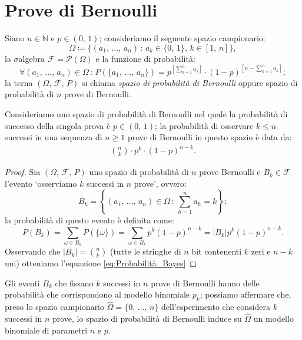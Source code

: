     \section{Prove di Bernoulli}
        \begin{defn}
            Siano $n \in \mathbb{N}$ e $p \in (0,\,1)$; consideriamo il seguente spazio campionario: \[
                \Omega \coloneqq \{(a_1,\,\ldots,\,a_n)\,:\,a_k \in \{0,\,1\},\, k \in [1,\,n]\}
                ,\] la $\sigma$\nbdash algebra $\mathscr{F} = \mathscr{P}(\Omega)$ e la funzione di probabilità: \[
                \forall (a_1,\, \ldots,\, a_n) \in \Omega \,:\, P(\{a_1,\, \ldots,\, a_n\}) = p^{\left[\sum_{k=1}^{n} a_k\right]} \cdot (1 - p)^{\left[n - \sum_{k=1}^{n} a_k\right]}
            ;\] 
            la terna $(\Omega,\,\mathscr{F},\,P)$ si chiama \emph{spazio di probabilità di Bernoulli} oppure spazio di probabilità di $n$ prove di Bernoulli.
        \end{defn}
        \begin{prty}
            Consideriamo uno spazio di probabilità di Bernoulli nel quale la probabilità di successo della singola prova è $p \in (0,\,1)$; la probabilità di osservare $k \leq n$ successi in una sequenza di $n \geq 1$ prove di Bernoulli in questo spazio è data da:
            \begin{align}\label{eq:Probabilità_Bayes}
                \binom{n}{k} \cdot p^{k} \cdot (1 - p)^{n-k}
            .
            \end{align}
        \end{prty}
        \begin{proof}
            Sia $(\Omega,\,\mathscr{F},\,P )$ uno spazio di probabilità di $n$ prove Bernoulli e $B_k \in \mathscr{F}$ l'evento `osserviamo $k$ successi in $n$ prove', ovvero: \[
                B_k = \left\{ (a_1,\, \ldots,\, a_n) \in \Omega \,:\, \sum_{h=1}^{n} a_h = k \right\} 
            ;\] la probabilità di questo evento è definita come: \[
                P(B_k) = \sum_{\omega \in B_k} P(\{\omega\}) = \sum_{\omega \in B_k} p^{k}(1 - p)^{n - k} = |B_k|p^{k}(1 - p)^{n - k}
            .\] Osservando che $|B_k| = \binom{n}{k}$ (tutte le stringhe di $n$ bit contenenti $k$ zeri e $n - k$ uni) otteniamo l'equazione \eqref{eq:Probabilità_Bayes}
        \end{proof}
    \begin{obsv}
        Gli eventi $B_k$ che fissano $k$ successi in $n$ prove di Bernoulli hanno delle probabilità che corrispondono al modello binomiale $p_k$; possiamo affermare che, preso lo spazio campionario $\hat{\Omega} = \{0,\,\ldots,\,n\}$ dell'esperimento che considera $k$ successi in $n$ prove, lo spazio di probabilità di Bernoulli induce su $\hat{\Omega}$ un modello binomiale di parametri $n$ e $p$.
    \end{obsv} 
